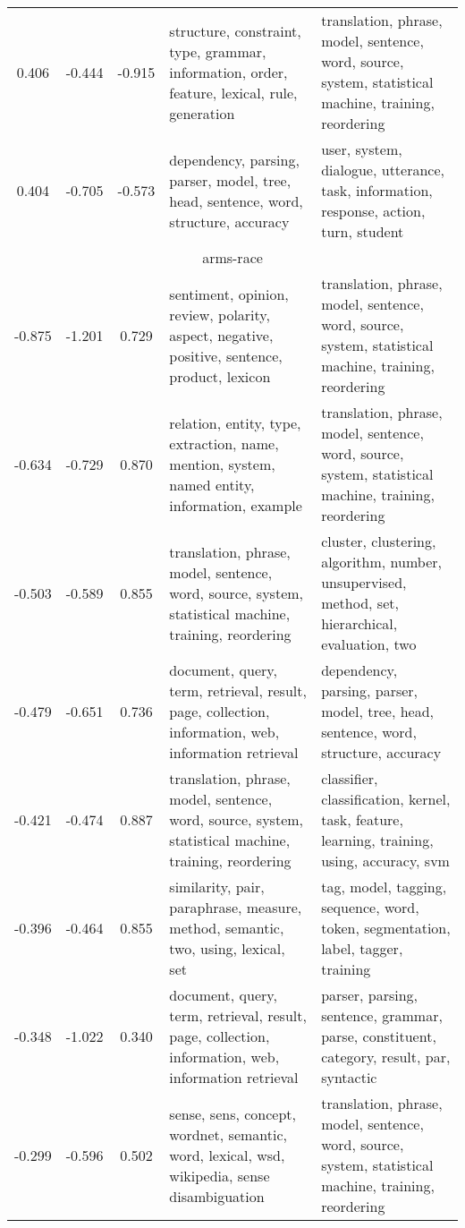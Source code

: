 \begin{tabular}{cccp{5cm}p{5cm}}
0.406 & -0.444 & -0.915 & structure, constraint, type, grammar, information, order, feature, lexical, rule, generation & translation, phrase, model, sentence, word, source, system, statistical machine, training, reordering \\
0.404 & -0.705 & -0.573 & dependency, parsing, parser, model, tree, head, sentence, word, structure, accuracy & user, system, dialogue, utterance, task, information, response, action, turn, student \\
\midrule
\multicolumn{5}{c}{arms-race}\\
-0.875 & -1.201 & 0.729 & sentiment, opinion, review, polarity, aspect, negative, positive, sentence, product, lexicon & translation, phrase, model, sentence, word, source, system, statistical machine, training, reordering \\
-0.634 & -0.729 & 0.870 & relation, entity, type, extraction, name, mention, system, named entity, information, example & translation, phrase, model, sentence, word, source, system, statistical machine, training, reordering \\
-0.503 & -0.589 & 0.855 & translation, phrase, model, sentence, word, source, system, statistical machine, training, reordering & cluster, clustering, algorithm, number, unsupervised, method, set, hierarchical, evaluation, two \\
-0.479 & -0.651 & 0.736 & document, query, term, retrieval, result, page, collection, information, web, information retrieval & dependency, parsing, parser, model, tree, head, sentence, word, structure, accuracy \\
-0.421 & -0.474 & 0.887 & translation, phrase, model, sentence, word, source, system, statistical machine, training, reordering & classifier, classification, kernel, task, feature, learning, training, using, accuracy, svm \\
-0.396 & -0.464 & 0.855 & similarity, pair, paraphrase, measure, method, semantic, two, using, lexical, set & tag, model, tagging, sequence, word, token, segmentation, label, tagger, training \\
-0.348 & -1.022 & 0.340 & document, query, term, retrieval, result, page, collection, information, web, information retrieval & parser, parsing, sentence, grammar, parse, constituent, category, result, par, syntactic \\
-0.299 & -0.596 & 0.502 & sense, sens, concept, wordnet, semantic, word, lexical, wsd, wikipedia, sense disambiguation & translation, phrase, model, sentence, word, source, system, statistical machine, training, reordering \\

\end{tabular}
